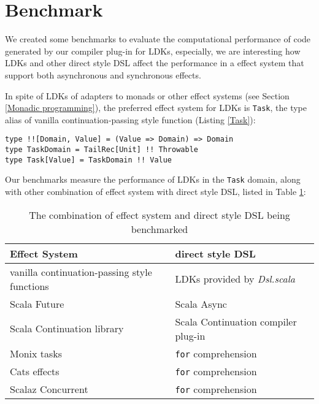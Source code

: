 \section{Benchmark}\label{Benchmark}

We created some benchmarks to evaluate the computational performance of code generated by our compiler plug-in for LDKs, especially, we are interesting how LDKs and other direct style DSL affect the performance in a effect system that support both asynchronous and synchronous effects.

In spite of LDKs of adapters to monads or other effect systems (see Section \ref{Monadic programming}), the preferred effect system for LDKs is \lstinline{Task}, the type alias of vanilla continuation-passing style function (Listing \ref{Task}):

\begin{lstlisting}[caption={The definition of \lstinline{Task}, the preferred effect system using with LDKs},label={Task}]
type !![Domain, Value] = (Value => Domain) => Domain
type TaskDomain = TailRec[Unit] !! Throwable
type Task[Value] = TaskDomain !! Value
\end{lstlisting}

Our benchmarks measure the performance of LDKs in the \lstinline{Task} domain, along with other combination of effect system with direct style DSL, listed in Table \ref{combination}:
\begin{table}[htbp]
  \begin{tabular}{l|l}
    Effect System & direct style DSL \\
    \hline
    vanilla continuation-passing style functions & LDKs provided by \textit{Dsl.scala} \\
    Scala Future \cite{haller2012sip} & Scala Async \cite{haller2013sip} \\
    Scala Continuation library \cite{rompf2009implementing} & Scala Continuation compiler plug-in \\
    Monix tasks \cite{nedelcu2017monix} & \texttt{for} comprehension \\
    Cats effects \cite{typelevel2017cats} & \texttt{for} comprehension \\
    Scalaz Concurrent \cite{kenji2017scalaz} & \texttt{for} comprehension \\
  \end{tabular}
  \caption{The combination of effect system and direct style DSL being benchmarked}
  \label{combination}
\end{table}

